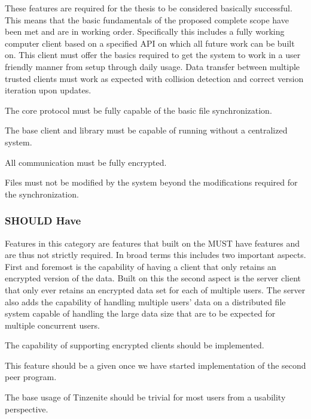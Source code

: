 These features are required for the thesis to be considered basically successful.
This means that the basic fundamentals of the proposed complete scope have been met and are in working order.
Specifically this includes a fully working computer client based on a specified API on which all future work can be built on.
This client must offer the basics required to get the system to work in a user friendly manner from setup through daily usage.
Data transfer between multiple trusted clients must work as expected with collision detection and correct version iteration upon updates.

\begin{description}[leftmargin=13em,style=nextline,noitemsep,nolistsep]
\item[Protocol]
    The core protocol must be fully capable of the basic file synchronization.
\item[Peer to Peer Architecture]
    The base client and library must be capable of running without a centralized system.
\item[Secure Transport]
    All communication must be fully encrypted.
\item[Object Atomicity]
    Files must not be modified by the system beyond the modifications required for the synchronization.
\end{description}

\subsubsection{SHOULD Have}
\label{subs:SHOULD Have}

Features in this category are features that built on the MUST have features and are thus not strictly required.
In broad terms this includes two important aspects.
First and foremost is the capability of having a client that only retains an encrypted version of the data.
Built on this the second aspect is the server client that only ever retains an encrypted data set for each of multiple users.
The server also adds the capability of handling multiple users' data on a distributed file system capable of handling the large data size that are to be expected for multiple concurrent users.

\begin{description}[leftmargin=9em,style=nextline,noitemsep,nolistsep]
\item[Third Party Client]
    The capability of supporting encrypted clients should be implemented.
\item[Client Agnostic]
    This feature should be a given once we have started implementation of the second peer program.
\item[Usability]
    The base usage of Tinzenite should be trivial for most users from a usability perspective.
\end{description}

